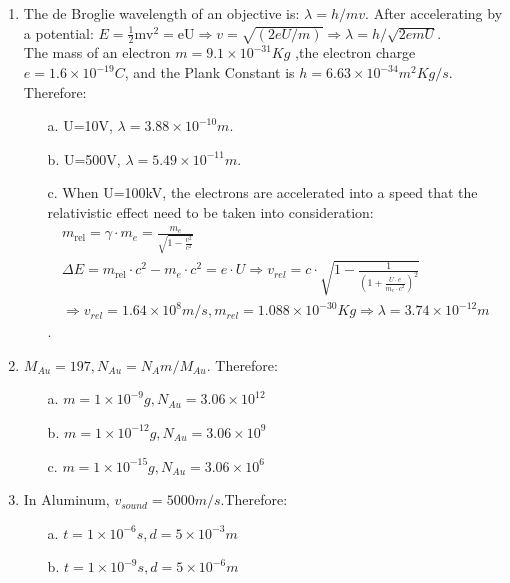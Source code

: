 \usepackage{float}
\usepackage{wrapfig}





 \begin{enumerate}
   \item The de Broglie wavelength of an objective is: $ \lambda={h}/{m v}$. After accelerating by a potential: $E=\frac{1}{2}\mathrm{mv}^{2}=\mathrm{eU}\Rightarrow v=\sqrt{(2eU/m)} \Rightarrow \lambda={h}/\sqrt{2emU}$.\\ 
   The mass of an electron $m = 9.1\times 10^{-31}Kg$ ,the electron charge $e = 1.6\times 10^{-19}C$, and the Plank Constant is $h=6.63\times 10^{-34} m^2Kg/s$. Therefore:
   \begin{enumerate}
       \item[a.] U=10V, $\lambda=3.88\times 10^{-10}m$.
       \item[b.] U=500V, $\lambda=5.49\times 10^{-11}m$.
       \item[c.] When U=100kV, the electrons are accelerated into a speed that the relativistic effect need to be taken into consideration: $$\begin{array}{c}{m_{\mathrm{rel}}=\gamma \cdot m_{e}=\frac{m_{e}}{\sqrt{1-\frac{v^{2}}{c^{2}}}} }\\{\Delta E = m_{\mathrm{rel}} \cdot c^{2}-m_{e} \cdot c^{2}=e\cdot U \Rightarrow v_{ rel}=c \cdot \sqrt{1-\frac{1}{\left(1+\frac{U \cdot e}{m_{e} \cdot c^{2}}\right)^{2}}}}\\{\Rightarrow v_{rel}=1.64\times 10^8 m/s, m_{rel}=1.088\times 10^{-30}Kg \Rightarrow \lambda= 3.74\times 10^{-12}m}\end{array}$$.
   \end{enumerate}
    
   \item $M_{Au}=197,N_{Au}=N_Am/M_{Au}$. Therefore: 
   \begin{enumerate}
       \item[a.] $m=1\times 10^{-9}g, N_{Au}=3.06\times 10^{12}$
       \item[b.] $m=1\times 10^{-12}g, N_{Au}=3.06\times 10^{9}$
       \item[c.] $m=1\times 10^{-15}g, N_{Au}=3.06\times 10^{6}$
   \end{enumerate}
   
   \item In Aluminum, $v_{sound}= 5000 m/s$.Therefore:
   \begin{enumerate}
       \item[a.] $t=1\times 10^{-6}s, d=5\times 10^{-3}m$
       \item[b.]$t=1\times 10^{-9}s, d=5\times 10^{-6}m$
   \end{enumerate}
   

\end{enumerate}
